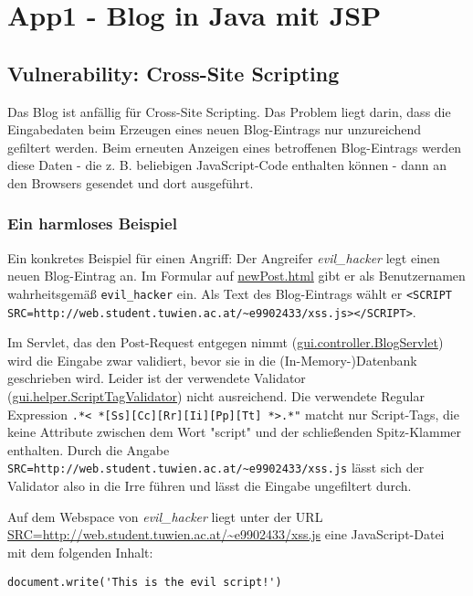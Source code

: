 \section{App1 - Blog in Java mit JSP}

\subsection{Vulnerability: Cross-Site Scripting}

Das Blog ist anfällig für Cross-Site Scripting. Das Problem liegt darin, dass die Eingabedaten beim Erzeugen eines neuen Blog-Eintrags nur unzureichend gefiltert werden. Beim erneuten Anzeigen eines betroffenen Blog-Eintrags werden diese Daten - die z. B. beliebigen JavaScript-Code enthalten können - dann an den Browsers gesendet und dort ausgeführt.

\subsubsection{Ein harmloses Beispiel}

Ein konkretes Beispiel für einen Angriff: Der Angreifer \emph{evil\_hacker} legt einen neuen Blog-Eintrag an. Im Formular auf \url{newPost.html} gibt er als Benutzernamen wahrheitsgemäß \lstinline$evil_hacker$ ein. Als Text des Blog-Eintrags wählt er \lstinline$<SCRIPT SRC=http://web.student.tuwien.ac.at/~e9902433/xss.js></SCRIPT>$.

Im Servlet, das den Post-Request entgegen nimmt (\url{gui.controller.BlogServlet}) wird die Eingabe zwar validiert, bevor sie in die (In-Memory-)Datenbank geschrieben wird. Leider ist der verwendete Validator (\url{gui.helper.ScriptTagValidator}) nicht ausreichend. Die verwendete Regular Expression \lstinline$.*< *[Ss][Cc][Rr][Ii][Pp][Tt] *>.*"$ matcht nur Script-Tags, die keine Attribute zwischen dem Wort "script" und der schließenden Spitz-Klammer enthalten. Durch die Angabe \lstinline$SRC=http://web.student.tuwien.ac.at/~e9902433/xss.js$ lässt sich der Validator also in die Irre führen und lässt die Eingabe ungefiltert durch.

Auf dem Webspace von \emph{evil\_hacker} liegt unter der URL \url{SRC=http://web.student.tuwien.ac.at/~e9902433/xss.js} eine JavaScript-Datei mit dem folgenden Inhalt:

\begin{lstlisting}
document.write('This is the evil script!')
\end{lstlisting}

